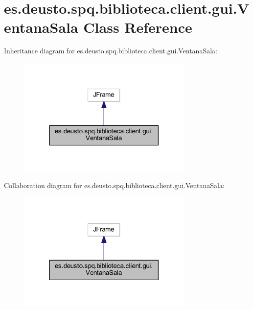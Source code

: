 \hypertarget{classes_1_1deusto_1_1spq_1_1biblioteca_1_1client_1_1gui_1_1_ventana_sala}{}\section{es.\+deusto.\+spq.\+biblioteca.\+client.\+gui.\+Ventana\+Sala Class Reference}
\label{classes_1_1deusto_1_1spq_1_1biblioteca_1_1client_1_1gui_1_1_ventana_sala}


Inheritance diagram for es.\+deusto.\+spq.\+biblioteca.\+client.\+gui.\+Ventana\+Sala\+:
\nopagebreak
\begin{figure}[H]
\begin{center}
\leavevmode
\includegraphics[width=247pt]{classes_1_1deusto_1_1spq_1_1biblioteca_1_1client_1_1gui_1_1_ventana_sala__inherit__graph}
\end{center}
\end{figure}


Collaboration diagram for es.\+deusto.\+spq.\+biblioteca.\+client.\+gui.\+Ventana\+Sala\+:
\nopagebreak
\begin{figure}[H]
\begin{center}
\leavevmode
\includegraphics[width=247pt]{classes_1_1deusto_1_1spq_1_1biblioteca_1_1client_1_1gui_1_1_ventana_sala__coll__graph}
\end{center}
\end{figure}
